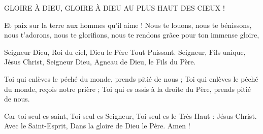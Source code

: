 GLOIRE À DIEU, GLOIRE À DIEU AU PLUS HAUT DES CIEUX !

Et paix sur la terre aux hommes qu'il aime !
Nous te louons, nous te bénissons, nous t'adorons,
nous te glorifions, nous te rendons grâce pour ton immense gloire,

Seigneur Dieu, Roi du ciel, Dieu le Père Tout Puissant.
Seigneur, Fils unique, Jésus Christ,
Seigneur Dieu, Agneau de Dieu, le Fils du Père.

Toi qui enlèves le péché du monde, prends pitié de nous ;
Toi qui enlèves le péché du monde, reçois notre prière ;
Toi qui es assis à la droite du Père, prends pitié de nous.

Car toi seul es saint, Toi seul es Seigneur,
Toi seul es le Très-Haut : Jésus Christ.
Avec le Saint-Esprit, Dans la gloire de Dieu le Père.
Amen !
